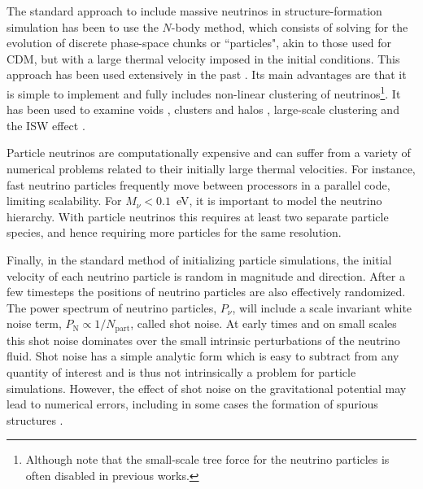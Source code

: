 \documentclass[useAMS, usenatbib]{mnras}
\begin{document}
The standard approach to include massive neutrinos in structure-formation simulation has been to use the $N$-body method, which consists of solving for the evolution of discrete phase-space chunks or ``particles", akin to those used for CDM, but with a
large thermal velocity imposed in the initial conditions. This approach has been used extensively in the past \cite[e.g.~][]{Brandbyge_2008, Bird_2012, Inman_2017, FVN_2017}. Its main advantages are that it is simple to implement and fully includes non-linear clustering of neutrinos\footnote{Although note that the small-scale tree force for the neutrino particles is often disabled in previous works.}. It has been used to examine voids \citep{Massara_2015}, clusters and halos \citep{FVN_2014, Castorina_2014, Costanzi_2013}, large-scale clustering \citep{Castorina_2015} and the ISW effect \citep{Carbone_2016}.

Particle neutrinos are computationally expensive and can suffer from a variety of numerical problems related to their initially large thermal velocities. For instance, fast neutrino particles frequently move between processors in a parallel code, limiting scalability. For $M_\nu < 0.1$~eV, it is important to model the neutrino hierarchy. With particle neutrinos this requires at least two separate particle species, and hence requiring more particles for the same resolution.

Finally, in the standard method of initializing particle simulations, the initial velocity of each neutrino particle is random in magnitude and direction. After a few timesteps the positions of neutrino particles are also effectively randomized. The power spectrum of neutrino particles, $P_\nu$, will include a scale invariant white noise term, $P_\mathrm{N} \propto 1/N_\mathrm{part}$, called shot noise. At early times and on small scales this shot noise dominates over the small intrinsic perturbations of the neutrino fluid. Shot noise has a simple analytic form which is easy to subtract from any quantity of interest and is thus not intrinsically a problem for particle simulations. However, the effect of shot noise on the gravitational potential may lead to numerical errors, including in some cases the formation of spurious structures \citep{Wang_White_07}.
\end{document}
